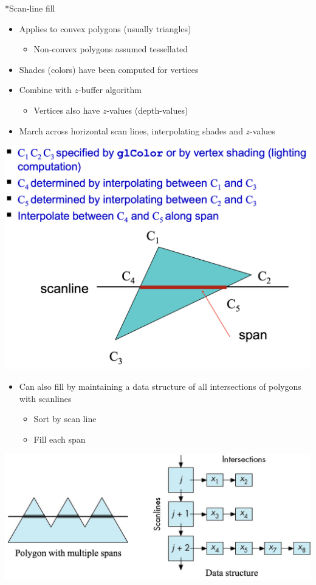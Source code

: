 \documentclass[12pt, landscape]{article}
\makeatletter
\renewcommand{\subsection}{
  \@startsection{subsection}{2}{0pt}{1ex}{1.2ex} {\raggedleft\normalfont\normalsize\bfseries\fbox}}
\makeatother
\begin{document}
\begin{multicols}{2}
  \subsection*{Scan-line fill}
    \begin{itemize}[leftmargin=*]
      \item Applies to convex polygons (usually triangles)
        \begin{itemize}[leftmargin=*]
          \item Non-convex polygons assumed tessellated
        \end{itemize}
      \item Shades (colors) have been computed for vertices
      \item Combine with $z$-buffer algorithm
        \begin{itemize}[leftmargin=*]
          \item Vertices also have $z$-values (depth-values)
        \end{itemize}
      \item March across horizontal scan lines, interpolating shades and $z$-values
    \end{itemize}
    \includegraphics[width=\columnwidth]{L6/scan-line}
    \begin{itemize}[leftmargin=*]
      \item Can also fill by maintaining a data structure of all intersections of polygons with scanlines
        \begin{itemize}[leftmargin=*]
          \item Sort by scan line
          \item Fill each span
        \end{itemize}
    \end{itemize}
    \includegraphics[width=\columnwidth]{L6/scan-line-ds}

\end{multicols}
\end{document}
